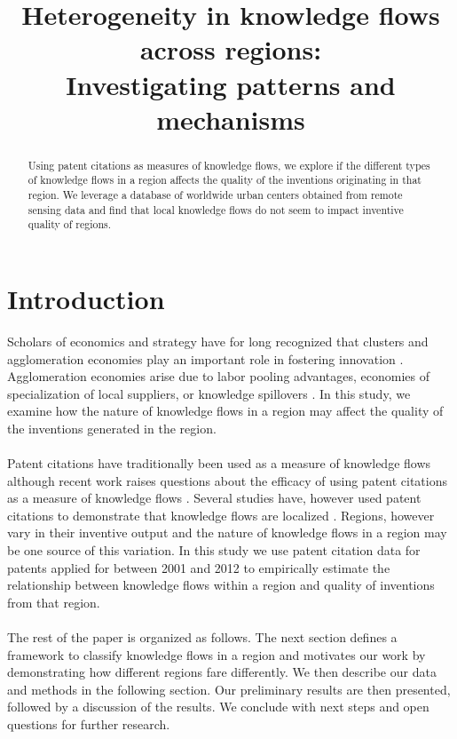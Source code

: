 \documentclass[10pt,letterpaper]{article}
\begin{document}
\title{Heterogeneity in knowledge flows across regions:\\ Investigating patterns and mechanisms}
\date{\vspace{-5ex}}

\maketitle
\thispagestyle{empty}
\begin{abstract}
\noindent Using patent citations as measures of knowledge flows, we explore if the different types of knowledge flows in a region affects the quality of the inventions originating in that region. We leverage a database of worldwide urban centers  obtained from remote sensing data and find that  local knowledge flows  do not seem to impact inventive quality of regions.
\end{abstract}

\section*{Introduction}
Scholars of economics and strategy have for long recognized that clusters and agglomeration economies play an important role in fostering innovation \citep{Marshall1890, Porter1990}. Agglomeration economies arise due to labor pooling advantages, economies of specialization of local suppliers, or knowledge spillovers \citep{Porter1990, Krugman1991}. In this study, we examine how the nature of knowledge flows in a region may affect the quality of the inventions generated in the region.
\\\\
Patent citations have traditionally been used as a  measure of knowledge flows \citep{Jaffe1993} although recent work raises questions about the efficacy of using patent citations as a measure of knowledge flows \citep{Arora2017}. Several studies have, however used patent citations to demonstrate that knowledge flows are localized \citep{Jaffe1993, Almeida1999, Alcacer2006a}. Regions, however vary in their inventive output \citep{Agrawal2014} and the nature of knowledge flows in a region may be one source of this variation. In this study we use patent citation data for patents applied for between 2001 and 2012 to empirically estimate the relationship between knowledge flows within a region and quality of inventions from that region. 
\\\\
The rest of the paper is organized as follows. The next section defines a framework to classify knowledge flows in a region and motivates our work by demonstrating how different regions fare differently. We then describe our data and methods in the following section. Our preliminary results are then presented, followed by a discussion of the results. We conclude with next steps and open questions for further research.
\end{document}
